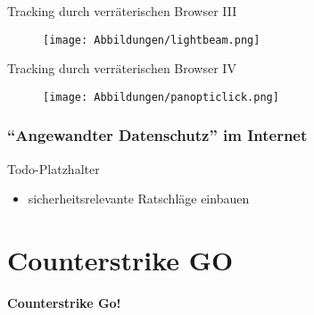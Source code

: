 \documentclass[utf8]{beamer}
\begin{document}
	\begin{frame}{Tracking durch verräterischen Browser III}
		\begin{figure}[V]
			\texttt{[image: Abbildungen/lightbeam.png]}
			\label{fig:lightbeam}
		\end{figure}
	\end{frame}

	\begin{frame}{Tracking durch verräterischen Browser IV}
		\begin{figure}[V]
			\texttt{[image: Abbildungen/panopticlick.png]}
			\label{fig:panopticlick}
		\end{figure}
	\end{frame}
	
	\subsubsection{\enquote{Angewandter Datenschutz} im Internet}
	
		\begin{frame}{Todo-Platzhalter}
			\begin{itemize}
				\item sicherheitsrelevante Ratschläge einbauen

			\end{itemize}
		\end{frame}
	
	\section{Counterstrike GO}
	\begin{frame}
		\centering \huge \textbf{Counterstrike Go!}
	\end{frame}
\end{document}
